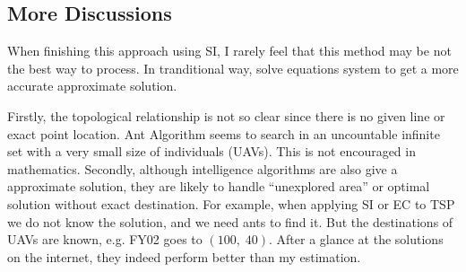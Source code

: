 \documentclass[11pt,en]{elegantpaper}
\begin{document}
\subsection{More Discussions}
When finishing this approach using SI, I rarely feel that this method may be not the best way to process.
In tranditional way, solve equations system to get a more accurate approximate solution.

Firstly, the topological relationship is not so clear since there is no given line or exact point location.
Ant Algorithm seems to search in an uncountable infinite set with a very small size of individuals (UAVs).
This is not encouraged in mathematics.
Secondly, although intelligence algorithms are also give a approximate solution, they are likely
to handle ``unexplored area'' or optimal solution without exact destination.
For example, when applying SI or EC to TSP we do not know the solution, and we need ants to find it.
But the destinations of UAVs are known, e.g. FY02 goes to $(100,\;40)$.
After a glance at the solutions on the internet, they indeed perform better than my estimation.

\printbibliography[heading=bibintoc, title=\ebibname]

\end{document}

